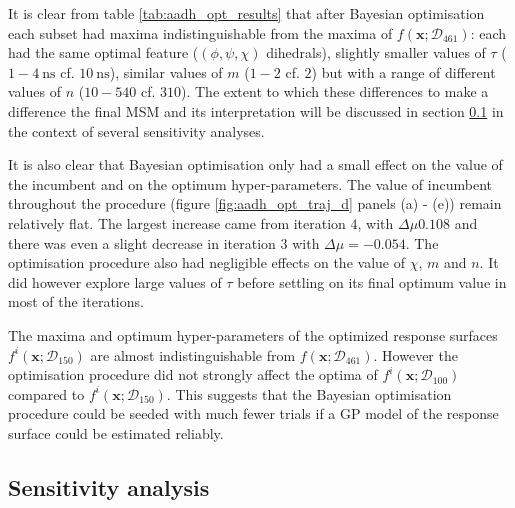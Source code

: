  It is clear from  table \ref{tab:aadh_opt_results} that after Bayesian optimisation each subset had maxima indistinguishable from the maxima of $f(\mathbf{x};\mathcal{D}_{461})$: each had the same optimal feature ($(\phi, \psi, \chi)$ dihedrals), slightly smaller values of $\tau$ ($1 - \SI{4}{\nano\second}$ cf. $\SI{10}{\nano\second}$), similar values of $m$ ($1 - 2$ cf. $2$) but with a range of different values of $n$ ($10 - 540$ cf. $310$). The extent to which these differences to make a difference the final MSM and its interpretation will be discussed in section \ref{subsubsec:sensitivity_analysis} in the context of several sensitivity analyses. 
 
It is also clear that Bayesian optimisation only had a small effect on the value of the incumbent and on the optimum hyper-parameters.  The value of incumbent throughout the procedure (figure \ref{fig:aadh_opt_traj_d} panels (a) - (e)) remain relatively flat. The largest increase came from iteration $4$, with $\Delta \mu 0.108$ and there was even a slight decrease in iteration $3$ with $\Delta \mu = -0.054$. The optimisation procedure also had negligible effects on the value of $\chi$, $m$ and $n$. It did however explore large values of  $\tau$ before settling on its final optimum value in most of the iterations.

The maxima and optimum hyper-parameters of the optimized response surfaces $f^{i}(\mathbf{x};\mathcal{D}_{150})$ are almost indistinguishable from $f(\mathbf{x};\mathcal{D}_{461})$. However the optimisation procedure did not strongly affect the optima of $f^{i}(\mathbf{x};\mathcal{D}_{100})$ compared to $f^{i}(\mathbf{x};\mathcal{D}_{150})$. This suggests that the Bayesian optimisation procedure could be seeded with much fewer trials if a GP model of the response surface could be estimated reliably. 

\subsection{Sensitivity analysis}\label{subsubsec:sensitivity_analysis}

